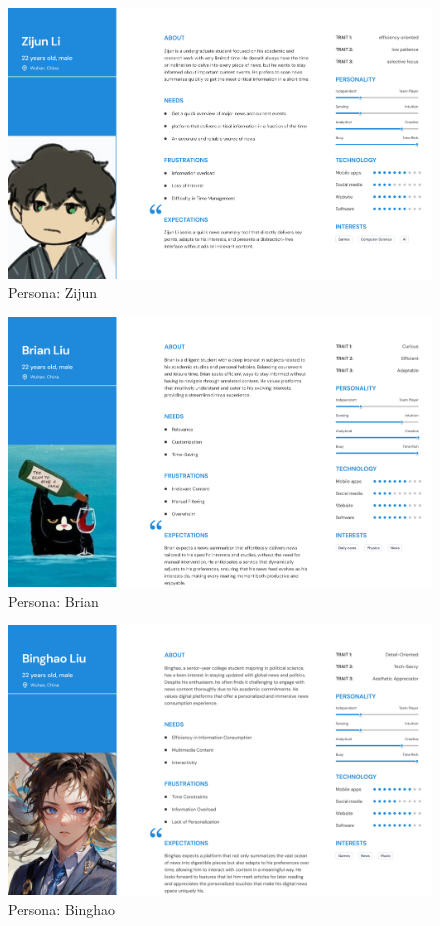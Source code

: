 \documentclass[10pt]{article}
\begin{document}
\begin{figure}[H]
    \centering
    \includegraphics[width=\textwidth]{../persona zijun.png}
    \caption{Persona: Zijun}
    \label{fig:persona-zijun}
\end{figure}

\begin{figure}[H]
    \centering
    \includegraphics[width=\textwidth]{../persona brian.png}
    \caption{Persona: Brian}
    \label{fig:persona-brian}
\end{figure}

\begin{figure}[H]
    \centering
    \includegraphics[width=\textwidth]{../persona binghao.png}
    \caption{Persona: Binghao}
    \label{fig:persona-binghao}
\end{figure}
\end{document}
